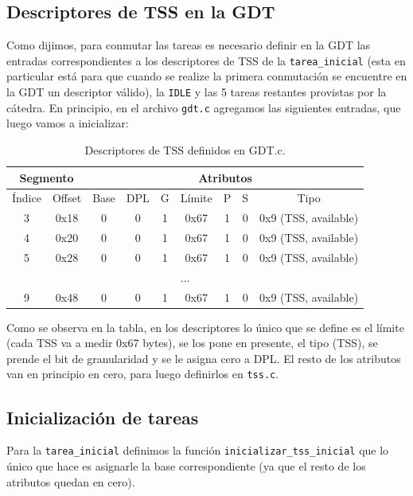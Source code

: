 \documentclass[10pt, a4paper]{article}
\begin{document}
\subsection{Descriptores de TSS en la GDT}
Como dijimos, para conmutar las tareas es necesario definir en la GDT las entradas correspondientes a los descriptores de TSS de la \texttt{tarea\_inicial}
 (esta en particular está para que cuando se realize la primera conmutación se encuentre en la GDT un descriptor válido), la \texttt{IDLE} y las 5 
tareas restantes provistas por la cátedra.
En principio, en el archivo \texttt{gdt.c} agregamos las siguientes entradas, que luego vamos a inicializar:
\begin{table}[!h]
\begin{center}
	\begin{tabular}{|c|c|c|c|c|c|c|c|c|}
	\hline
	\multicolumn{2}{|c|}{Segmento}	& \multicolumn{7}{|c|}{Atributos}\\ \hline
	\'Indice &	Offset	& Base 	 & DPL & G & L\'imite & P & S& Tipo  \\ \hline
	3	& 0x18		& 0	         & 0  & 1 & 0x67    & 1 & 0&0x9 (TSS, available) \\ \hline
	4	& 0x20		& 0	         & 0  & 1 & 0x67    & 1 & 0&0x9 (TSS, available) \\ \hline
	5	& 0x28		& 0		 & 0  & 1 & 0x67    & 1 & 0&0x9 (TSS, available) \\ \hline
	\multicolumn{9}{c}{$\dots$}\\ \hline
	9	& 0x48		& 0		 & 0  & 1 & 0x67    & 1 & 0&0x9 (TSS, available) \\ \hline
	\end{tabular}
	\caption{Descriptores de TSS definidos en GDT.c.}
\end{center}
\end{table}
\newpage
Como se observa en la tabla, en los descriptores lo único que se define es el límite (cada TSS va a medir 0x67 bytes), se los pone en presente, el tipo (TSS), se
prende el bit de granularidad y se le asigna cero a DPL. El resto de los atributos van en principio en cero, para luego definirlos en \texttt{tss.c}.
\subsection{Inicialización de tareas}
Para la \texttt{tarea\_inicial} definimos la función \texttt{inicializar\_tss\_inicial} que lo único que hace es asignarle la base correspondiente (ya que el resto
de los atributos quedan en cero).
\end{document}
